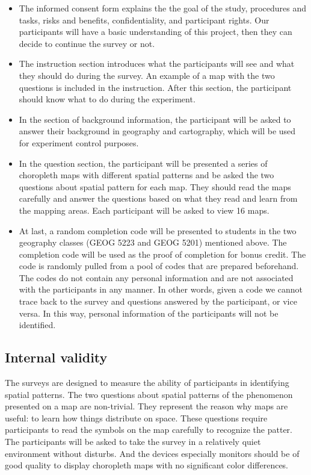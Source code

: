 \begin{itemize}
    \item The informed consent form explains the the goal of the study, procedures and tasks, risks and benefits, confidentiality, and participant rights. Our participants will have a basic understanding of this project, then they can decide to continue the survey or not. 
    
    \item The instruction section introduces what the participants will see and what they should do during the survey. An example of a map with the two questions is included in the instruction. After this section, the participant should know what to do during the experiment. 

    \item In the section of background information, the participant will be asked to answer their background in geography and cartography, which will be used for experiment control purposes. 

    \item In the question section, the participant will be presented a series of choropleth maps with different spatial patterns and be asked the two questions about spatial pattern for each map. They should read the maps carefully and answer the questions based on what they read and learn from the mapping areas. Each participant will be asked to view 16 maps.

    \item At last, a random completion code will be presented to students in the two geography classes (GEOG 5223 and GEOG 5201) mentioned above. The completion code will be used as the proof of completion for bonus credit. The code is randomly pulled from a pool of codes that are prepared beforehand. The codes do not contain any personal information and are not associated with the participants in any manner. In other words, given a code we cannot trace back to the survey and questions answered by the participant, or vice versa. In this way, personal information of the participants will not be identified.
\end{itemize}

\subsection{Internal validity}

The surveys are designed to measure the ability of participants in identifying spatial patterns. The two questions about spatial patterns of the phenomenon presented on a map are non-trivial. They represent the reason why maps are useful: to learn how things distribute on space. These questions require participants to read the symbols on the map carefully to recognize the patter. The participants will be asked to take the survey in a relatively quiet environment without disturbs. And the devices especially monitors should be of good quality to display choropleth maps with no significant color differences. 

